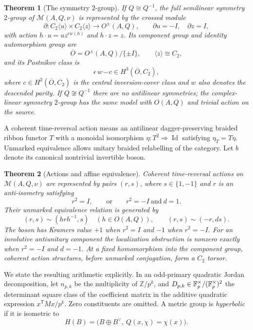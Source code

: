 \documentclass{amsart}
\newtheorem{theorem}{Theorem}[section]
\theoremstyle{definition}\newtheorem{definition}[theorem]{Definition}
\theoremstyle{remark}\newtheorem{remark}[theorem]{Remark}
\newcommand{\Z}{\mathbb Z}\newcommand{\Q}{\mathbb Q}
\newcommand{\M}{\mathcal M}\newcommand{\D}{\mathcal D}
\newcommand{\Id}{\operatorname{Id}}\newcommand{\Aut}{\operatorname{Aut}}
\begin{document}
\begin{theorem}[The symmetry $2$-group]\label{thm:2group}
If $Q\cong Q^{-1}$, the full semilinear symmetry $2$-group of
$\M(A,Q,\nu)$ is represented by the crossed module
\begin{equation}\label{eq:crossed}
 \partial:C_2\langle u\rangle\times C_2\langle z\rangle
       \longrightarrow O^{\pm}(A,Q),\qquad
 \partial u=-I,\quad \partial z=I,
\end{equation}
with action $h\cdot u=u z^{\epsilon w(h)}$ and $h\cdot z=z$.
Its component group and identity automorphism group are
\[
 \overline O=O^{\pm}(A,Q)/\{\pm I\},\qquad \langle z\rangle\cong C_2,
\]
and its Postnikov class is
\begin{equation}\label{eq:postnikov}
             \epsilon\,w\smile c\in H^3(\overline O,C_2),
\end{equation}
where $c\in H^2(\overline O,C_2)$ is the central inversion-cover class
and $w$ also denotes the descended parity.
If $Q\not\cong Q^{-1}$ there are no antilinear symmetries; the
complex-linear symmetry $2$-group has the same model with $O(A,Q)$
and trivial action on the source.
\end{theorem}

A coherent time-reversal action means an antilinear dagger-preserving
braided ribbon functor $T$ with a monoidal isomorphism
$\eta:T^2\Rightarrow\Id$ satisfying $\eta_T=T\eta$.
Unmarked equivalence allows unitary braided relabelling of the category.
Let $b$ denote its canonical nontrivial invertible boson.

\begin{theorem}[Actions and affine equivalence]\label{thm:actions}
Coherent time-reversal actions on $\M(A,Q,\nu)$ are represented by pairs
$(r,s)$, where $s\in\{1,-1\}$ and $r$ is an anti-isometry satisfying
\[
        r^2=I,\qquad\text{or}\qquad r^2=-I\ \text{and}\ d=1.
\]
Their unmarked equivalence relation is generated by
\begin{equation}\label{eq:affine}
 (r,s)\sim(h r h^{-1},s)\quad(h\in O(A,Q)),\qquad
 (r,s)\sim(-r,d s).
\end{equation}
The boson has Kramers value $+1$ when $r^2=I$ and $-1$ when $r^2=-I$.
For an involutive antiunitary component the localization obstruction is
nonzero exactly when $r^2=-I$ and $d=-1$.
At a fixed homomorphism into the component group, coherent action
structures, before unmarked conjugation, form a $C_2$ torsor.
\end{theorem}

We state the resulting arithmetic explicitly. In an odd-primary quadratic
Jordan decomposition, let $n_{p,k}$ be the multiplicity of $\Z/p^k$,
and $D_{p,k}\in\mathbb F_p^\times/(\mathbb F_p^\times)^2$ the determinant square
class of the coefficient matrix in the additive quadratic expression
$x^{\mathsf T}M x/p^k$. Zero constituents are omitted.
A metric group is \emph{hyperbolic} if it is isometric to
\[
 H(B)=\bigl(B\oplus B^\vee,\ Q(x,\chi)=\chi(x)\bigr).
\]
\end{document}
